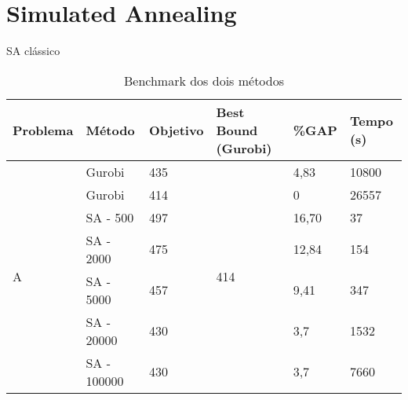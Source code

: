 \section{Simulated Annealing}
\label{sec:SA}

\begin{algorithm}
\caption{SA clássico}
\end{algorithm}

\begin{table}[H]
\caption{Benchmark dos dois métodos}
\label{tab:my-table}
\begin{tabular}{llllll}
\hline
Problema           & Método      & Objetivo & Best Bound (Gurobi)  & \%GAP & Tempo (s) \\ \hline
\multirow{7}{*}{A} & Gurobi      & 435      & \multirow{7}{*}{414} & 4,83  & 10800     \\
                   & Gurobi      & 414      &                      & 0     & 26557     \\
                   & SA - 500    & 497      &                      & 16,70 & 37        \\
                   & SA - 2000   & 475      &                      & 12,84 & 154       \\
                   & SA - 5000   & 457      &                      & 9,41  & 347       \\
                   & SA - 20000  & 430      &                      & 3,7   & 1532      \\
                   & SA - 100000 & 430      &                      & 3,7   & 7660      
\end{tabular}
\end{table}

